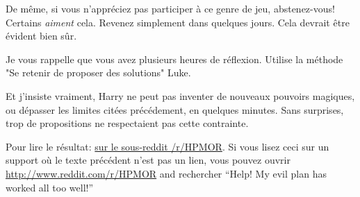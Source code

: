 {De même, si vous n'appréciez pas participer à ce genre de jeu, abstenez-vous! Certains \emph{aiment} cela. Revenez simplement dans quelques jours. Cela devrait être évident bien sûr.

Je vous rappelle que vous avez plusieurs heures de réflexion. Utilise la méthode "Se retenir de proposer des solutions" Luke.

Et j'insiste vraiment, Harry ne peut pas inventer de nouveaux pouvoirs magiques, ou dépasser les limites citées précédement, en quelques minutes.
\later
Sans surprises, trop de propositions ne respectaient pas cette contrainte.

Pour lire le résultat: \href{http://www.reddit.com/r/HPMOR/comments/2xnyi0/113_help_my_evil_plan_has_worked_all_too_well/}{sur le sous-reddit /r/HPMOR}. 
Si vous lisez ceci sur un support où le texte précédent n'est pas un lien, vous pouvez ouvrir \url{http://www.reddit.com/r/HPMOR} and rechercher “Help! My evil plan has worked all too well!”
}
